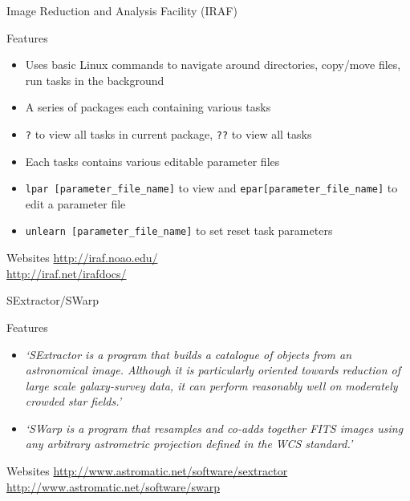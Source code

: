 \documentclass{beamer}
\begin{document}
\begin{frame}{Image Reduction and Analysis Facility (IRAF)}
  \begin{block}{Features}
   \begin{itemize}
    \item{Uses basic Linux commands to navigate around directories, copy/move files, run tasks in the background}
    \item{A series of packages each containing various tasks}
    \item{\texttt{?} to view all tasks in current package, \texttt{??} to view all tasks}
    \item{Each tasks contains various editable parameter files}
    \item{\texttt{lpar [parameter\_file\_name]} to view and \texttt{epar[parameter\_file\_name]} to edit a  parameter file}    
    \item{\texttt{unlearn [parameter\_file\_name]} to set reset task parameters}
   \end{itemize}
  \end{block}
  \begin{block}{Websites}
    \url{http://iraf.noao.edu/}\\
    \url{http://iraf.net/irafdocs/}
  \end{block}
\end{frame}

\begin{frame}{SExtractor/SWarp}
  \begin{block}{Features}
   \begin{itemize}
    \item{\textit{`SExtractor is a program that builds a catalogue of objects from an astronomical image. Although it is particularly oriented towards reduction of large scale galaxy-survey data, it can perform reasonably well on moderately crowded star fields.'}}
    \item{\textit{`SWarp is a program that resamples and co-adds together FITS images using any arbitrary astrometric projection defined in the WCS standard.'}}
   \end{itemize}
  \end{block}
  \begin{block}{Websites}
    \url{http://www.astromatic.net/software/sextractor}\\
    \url{http://www.astromatic.net/software/swarp}
  \end{block}
\end{frame}
\end{document}
